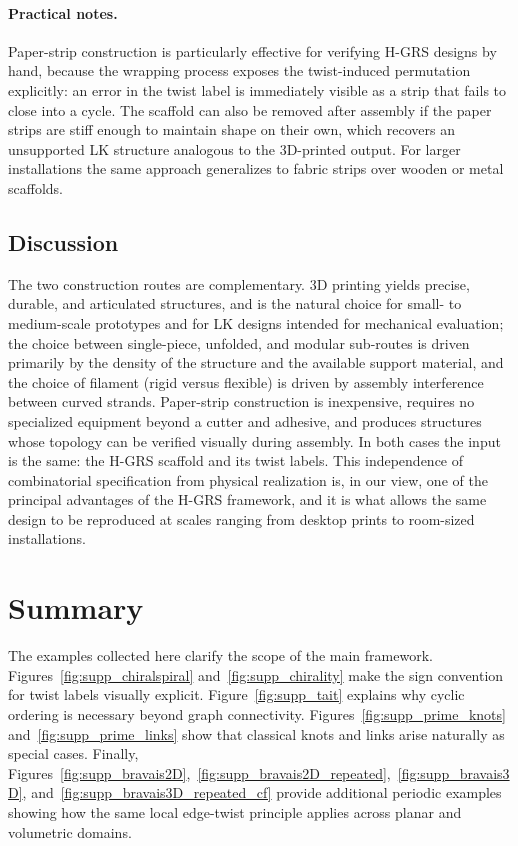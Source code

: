 \documentclass[acmtog,nonacm]{acmart}
\begin{document}
\paragraph{Practical notes.}
Paper-strip construction is particularly effective for verifying
H-GRS designs by hand, because the wrapping process exposes the
twist-induced permutation explicitly: an error in the twist label
is immediately visible as a strip that fails to close into a cycle.
The scaffold can also be removed after assembly if the paper strips
are stiff enough to maintain shape on their own, which recovers an
unsupported LK structure analogous to the 3D-printed output. For
larger installations the same approach generalizes to fabric strips
over wooden or metal scaffolds.

\subsection{Discussion}

The two construction routes are complementary. 3D printing yields
precise, durable, and articulated structures, and is the natural
choice for small- to medium-scale prototypes and for LK designs
intended for mechanical evaluation; the choice between single-piece,
unfolded, and modular sub-routes is driven primarily by the density
of the structure and the available support material, and the choice
of filament (rigid versus flexible) is driven by assembly
interference between curved strands. Paper-strip construction is
inexpensive, requires no specialized equipment beyond a cutter and
adhesive, and produces structures whose topology can be verified
visually during assembly. In both cases the input is the same: the
H-GRS scaffold and its twist labels. This independence of
combinatorial specification from physical realization is, in our
view, one of the principal advantages of the H-GRS framework, and
it is what allows the same design to be reproduced at scales ranging
from desktop prints to room-sized installations.

\section{Summary}

The examples collected here clarify the scope of the main framework. Figures~\ref{fig:supp_chiralspiral} and~\ref{fig:supp_chirality} make the sign convention for twist labels visually explicit. Figure~\ref{fig:supp_tait} explains why cyclic ordering is necessary beyond graph connectivity. Figures~\ref{fig:supp_prime_knots} and~\ref{fig:supp_prime_links} show that classical knots and links arise naturally as special cases. Finally, Figures~\ref{fig:supp_bravais2D},~\ref{fig:supp_bravais2D_repeated},~\ref{fig:supp_bravais3D}, and~\ref{fig:supp_bravais3D_repeated_cf} provide additional periodic examples showing how the same local edge-twist principle applies across planar and volumetric domains.



\end{document}
